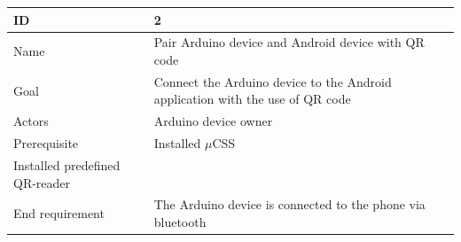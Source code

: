\begin{table}
    \begin{tabular}{|l|l|}
        \hline
        ID               & 2                                                                                                                                                                                                                                                                                                          \\ \hline
        Name             & Pair Arduino device and Android device with QR code                                                                                                                                                                                                                                                        \\ 
        Goal             & Connect the Arduino device to the Android application with the use of QR code                                                                                                                                                                                                                              \\ 
        Actors           & Arduino device owner                                                                                                                                                                                                                                                                                       \\ 
        Prerequisite     &     Installed $\mu$CSS \\     Installed predefined QR-reader                                                                                                                                                                                                                                                  \\ 
        End requirement  & The Arduino device is connected to the phone via bluetooth                                                                                                                                                                                                                                                 \\ 

\end{tabular}
\end{table}
